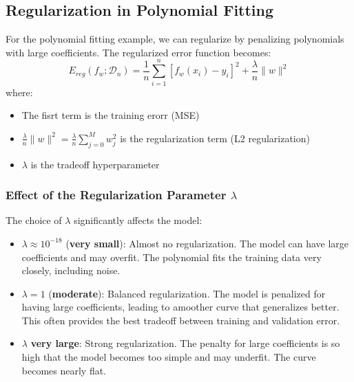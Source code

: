\documentclass[a4paper]{article}
\theoremstyle{definition}
\begin{document}
\subsection{Regularization in Polynomial Fitting}
For the polynomial fitting example, we can regularize by penalizing polynomials with large coefficients. The regularized error function becomes:
\[
  E_{reg} (f_w;\mathcal{D}_n) = \frac{1}{n} \sum_{i = 1}^{n}[f_w(x_i) - y_i]^2 + \frac{\lambda}{n} \parallel w \parallel^2
\]
where:
\begin{itemize}
    \item The fisrt term is the training erorr (MSE)
    \item \( \frac{\lambda}{n} \parallel w \parallel^2 = \frac{\lambda}{n} \sum_{j = 0}^{M} w_{j}^2 \) is the regularization term (L2 regularization)
    \item \( \lambda \) is the tradeoff hyperparameter
\end{itemize}
\subsubsection{Effect of the Regularization Parameter \( \lambda \)}
The choice of \( \lambda \) significantly affects the model:
\begin{itemize}
    \item \( \lambda \approx 10^{-18} \) (\textbf{very small}): Almost no regularization. The model can have large coefficients 
        and may overfit. The polynomial fits the training data very closely, including noise.
    \item \( \lambda = 1 \) (\textbf{moderate}): Balanced regularization. The model is penalized for having large coefficients, leading to amoother curve that generalizes better. This often provides the best tradeoff between training and validation error.
    \item \( \lambda \) \textbf{very large}: Strong regularization. The penalty for large coefficients is so high that the model becomes too simple and may underfit. The curve becomes nearly flat.
\end{itemize}
\end{document}
